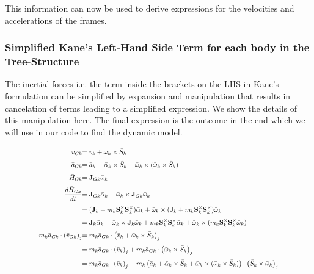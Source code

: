 \documentclass[a4paper,10pt]{article}
\newcommand\scalemath[2]{\scalebox{#1}{\mbox{\ensuremath{\displaystyle #2}}}}
\begin{document}
This information can now be used to derive expressions for the velocities and accelerations of the frames.

\subsubsection{Simplified Kane's Left-Hand Side Term for each body in the Tree-Structure}
The inertial forces i.e. the term inside the brackets on the LHS in Kane's formulation can be simplified by expansion
and manipulation that results in cancelation of terms leading to a simplified expression. We show the details of this
manipulation here. The final expression is the outcome in the end which we will use in our code to find the
dynamic model.

\begin{align}
 \scalemath{0.775}{\bar{v}_{Gk}}&\scalemath{0.775}{=\bar{v}_k+\bar{\omega}_k \times \bar{S}_k} \\
 \scalemath{0.775}{\bar{a}_{Gk}}&\scalemath{0.775}{=\bar{a}_k+\bar{\alpha}_k \times \bar{S}_k + \bar{\omega}_k \times (\bar{\omega}_k \times \bar{S}_k)} \label{aGk} \\
 \scalemath{0.775}{\bar{H}_{Gk}}&\scalemath{0.775}{=\mathbf{J}_{Gk} \bar{\omega}_k} \\ 
 \scalemath{0.775}{\frac{d\bar{H}_{Gk}}{dt}}&\scalemath{0.775}{=\mathbf{J}_{Gk} \bar{\alpha}_k + \bar{\omega}_k \times \mathbf{J}_{Gk} \bar{\omega}_k} \nonumber \\
 &\scalemath{0.775}{=(\mathbf{J}_{k}+m_k\mathbf{S}^{\times}_k\mathbf{S}^{\times}_k) \bar{\alpha}_k + \bar{\omega}_k \times (\mathbf{J}_{k}+m_k\mathbf{S}^{\times}_k\mathbf{S}^{\times}_k) \bar{\omega}_k} \nonumber \\
 &\scalemath{0.775}{=\mathbf{J}_{k} \bar{\alpha}_k + \bar{\omega}_k \times \mathbf{J}_{k} \bar{\omega}_k + m_k\mathbf{S}^{\times}_k\mathbf{S}^{\times}_k\bar{\alpha}_k + \bar{\omega}_k \times (m_k\mathbf{S}^{\times}_k\mathbf{S}^{\times}_k \bar{\omega}_k)} \\
 \scalemath{0.775}{m_k \bar{a}_{Gk} \cdot \left(\bar{v}_{Gk}\right)_j} &\scalemath{0.775}{=  m_k \bar{a}_{Gk} \cdot \left(\bar{v}_k+\bar{\omega}_k \times \bar{S}_k\right)_j} \nonumber \\
 &\scalemath{0.775}{=  m_k \bar{a}_{Gk} \cdot \left(\bar{v}_k\right)_j + m_k \bar{a}_{Gk} \cdot \left(\bar{\omega}_k \times \bar{S}_k\right)_j} \nonumber \\
 &\scalemath{0.775}{=  m_k \bar{a}_{Gk} \cdot \left(\bar{v}_k\right)_j - m_k \left( \bar{a}_k+\bar{\alpha}_k \times \bar{S}_k + \bar{\omega}_k \times (\bar{\omega}_k \times \bar{S}_k) \right) \cdot \left(\bar{S}_k \times \bar{\omega}_k\right)_j} \nonumber \\

\end{align}
\end{document}
